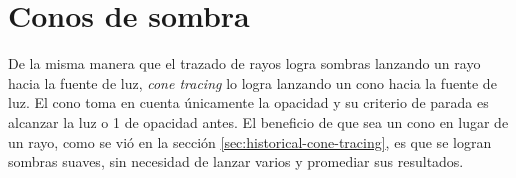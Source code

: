 \section{Conos de sombra}

De la misma manera que el trazado de rayos logra sombras lanzando un rayo hacia la fuente de luz, \textit{cone tracing} lo logra lanzando un cono hacia la fuente de luz.
El cono toma en cuenta únicamente la opacidad y su criterio de parada es alcanzar la luz o 1 de opacidad antes.
El beneficio de que sea un cono en lugar de un rayo, como se vió en la sección \ref{sec:historical-cone-tracing}, es que se logran sombras suaves, sin necesidad de lanzar varios y promediar sus resultados.

